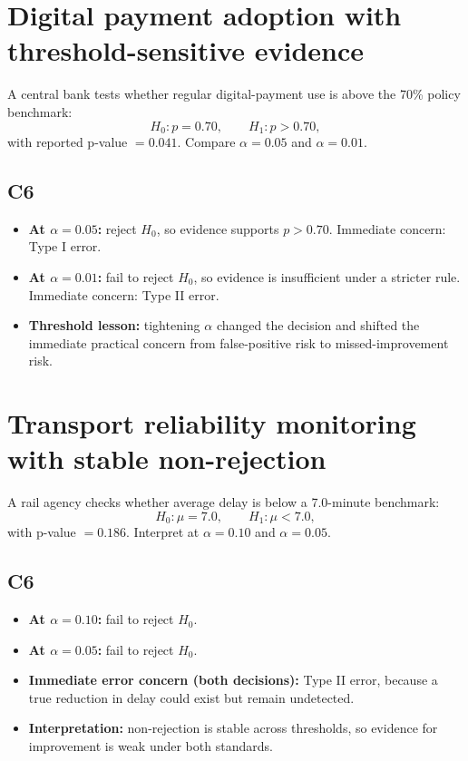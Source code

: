 	\section{Digital payment adoption with threshold-sensitive evidence}
	A central bank tests whether regular digital-payment use is above the 70\% policy benchmark:
	\[
	H_0\colon p=0.70,\qquad H_1\colon p>0.70,
	\]
	with reported p-value \(=0.041\). Compare \(\alpha=0.05\) and \(\alpha=0.01\).
	
	\begin{center}
		\hspace{0.8cm}
	\end{center}
	
	\subsection*{C6}
	\begin{itemize}
		\item \textbf{At \(\alpha=0.05\):} reject \(H_0\), so evidence supports \(p>0.70\). Immediate concern: Type I error.
		\item \textbf{At \(\alpha=0.01\):} fail to reject \(H_0\), so evidence is insufficient under a stricter rule. Immediate concern: Type II error.
		\item \textbf{Threshold lesson:} tightening \(\alpha\) changed the decision and shifted the immediate practical concern from false-positive risk to missed-improvement risk.
	\end{itemize}
	
	\section{Transport reliability monitoring with stable non-rejection}
	A rail agency checks whether average delay is below a 7.0-minute benchmark:
	\[
	H_0\colon \mu=7.0,\qquad H_1\colon \mu<7.0,
	\]
	with p-value \(=0.186\). Interpret at \(\alpha=0.10\) and \(\alpha=0.05\).
	
	\begin{center}
		\hspace{0.8cm}
	\end{center}
	
	\subsection*{C6}
	\begin{itemize}
		\item \textbf{At \(\alpha=0.10\):} fail to reject \(H_0\).
		\item \textbf{At \(\alpha=0.05\):} fail to reject \(H_0\).
		\item \textbf{Immediate error concern (both decisions):} Type II error, because a true reduction in delay could exist but remain undetected.
		\item \textbf{Interpretation:} non-rejection is stable across thresholds, so evidence for improvement is weak under both standards.
	\end{itemize}
	
